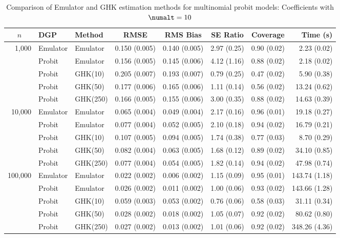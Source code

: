 \begin{table}[htbp]
\centering
\footnotesize
\begin{tabular}{@{}rllrrrrr@{}}
\toprule
\multicolumn{1}{c}{$n$} & \multicolumn{1}{l}{DGP} & \multicolumn{1}{l}{Method} & \multicolumn{1}{c}{RMSE} & \multicolumn{1}{c}{RMS Bias} & \multicolumn{1}{c}{SE Ratio} & \multicolumn{1}{c}{Coverage} & \multicolumn{1}{r}{Time (s)} \\
\midrule
\multirow{5}{*}{1,000} & Emulator & Emulator & 0.150 (0.005) & 0.140 (0.005) & 2.97 (0.25) & 0.90 (0.02) & 2.23 (0.02) \\
 & Probit & Emulator & 0.156 (0.005) & 0.145 (0.006) & 4.12 (1.16) & 0.88 (0.02) & 2.18 (0.02) \\
 & Probit & GHK(10) & 0.205 (0.007) & 0.193 (0.007) & 0.79 (0.25) & 0.47 (0.02) & 5.90 (0.38) \\
 & Probit & GHK(50) & 0.177 (0.006) & 0.165 (0.006) & 1.11 (0.14) & 0.56 (0.02) & 13.24 (0.62) \\
 & Probit & GHK(250) & 0.166 (0.005) & 0.155 (0.006) & 3.00 (0.35) & 0.88 (0.02) & 14.63 (0.39) \\
\midrule
\multirow{5}{*}{10,000} & Emulator & Emulator & 0.065 (0.004) & 0.049 (0.004) & 2.17 (0.16) & 0.96 (0.01) & 19.18 (0.27) \\
 & Probit & Emulator & 0.077 (0.004) & 0.052 (0.005) & 2.10 (0.18) & 0.94 (0.02) & 16.79 (0.21) \\
 & Probit & GHK(10) & 0.107 (0.005) & 0.094 (0.005) & 1.74 (0.38) & 0.77 (0.03) & 8.70 (0.29) \\
 & Probit & GHK(50) & 0.082 (0.004) & 0.063 (0.005) & 1.68 (0.12) & 0.89 (0.02) & 34.10 (0.85) \\
 & Probit & GHK(250) & 0.077 (0.004) & 0.054 (0.005) & 1.82 (0.14) & 0.94 (0.02) & 47.98 (0.74) \\
\midrule
\multirow{5}{*}{100,000} & Emulator & Emulator & 0.022 (0.002) & 0.006 (0.002) & 1.15 (0.09) & 0.95 (0.01) & 143.74 (1.18) \\
 & Probit & Emulator & 0.026 (0.002) & 0.011 (0.002) & 1.00 (0.06) & 0.93 (0.02) & 143.66 (1.28) \\
 & Probit & GHK(10) & 0.059 (0.003) & 0.053 (0.002) & 0.76 (0.06) & 0.58 (0.03) & 31.11 (0.34) \\
 & Probit & GHK(50) & 0.028 (0.002) & 0.018 (0.002) & 1.05 (0.07) & 0.92 (0.02) & 80.62 (0.80) \\
 & Probit & GHK(250) & 0.027 (0.002) & 0.013 (0.002) & 1.01 (0.06) & 0.92 (0.02) & 348.26 (4.36) \\
\bottomrule
\end{tabular}
\caption{Comparison of Emulator and GHK estimation methods for multinomial probit models: Coefficients with $\numalt=10$}
\label{tab:emulator_vs_ghk:10:beta}
\end{table}
